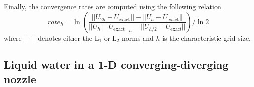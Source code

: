 \documentclass[preprint,10pt]{elsarticle}
\begin{document}
Finally, the convergence rates are computed using the following relation 
\begin{equation}
\label{eq:conv_rates}
rate_h = \ln \left( \frac{|| U_{2h}-U_{\text{exact}} || - || U_{h}-U_{\text{exact}} ||}{|| U_{h}-U_{\text{exact}} ||_h - || U_{h/2}-U_{\text{exact}} || } \right) / \ln 2
\end{equation}
where $|| \cdot ||$ denotes either the L$_1$ or L$_2$ norms and $h$ is the characteristic grid size.

\subsection{Liquid water in a 1-D converging-diverging nozzle} \label{sec:liquid_nozzle}
\end{document}

